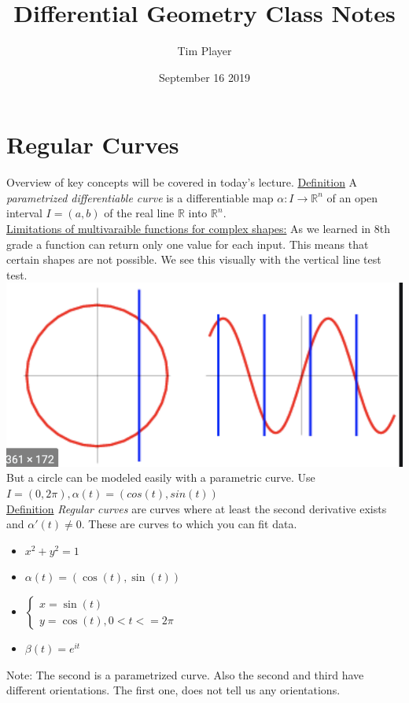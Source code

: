 \documentclass{article}
\title{Differential Geometry Class Notes}
\author{Tim Player }
\date{September 16 2019}
\begin{document}
\maketitle

\section{Regular Curves}
Overview of key concepts will be covered in today's lecture.
\underline{Definition}
A \emph{parametrized differentiable curve} is a differentiable map $\alpha : I \to \mathbb{R}^n$ of an open
interval $I = (a,b)$ of the real line $\mathbb{R}$ into $\mathbb{R}^n$. \\
\underline{Limitations of multivaraible functions for complex shapes:}
As we learned in 8th grade a function can return only one value for each input. This means that certain shapes are not possible. We see this visually with the vertical line test test. \\
\includegraphics[scale=.5]{vline.png} \\
But a circle can be modeled easily with a parametric curve. Use $I = (0, 2\pi), \alpha(t) = (cos(t), sin(t))$\\
\underline{Definition} \textit{Regular curves} are curves where at least the second derivative exists and $\alpha'(t) \ne 0$. These are curves to which you can fit data.
 \\

\begin{itemize}
    \item $x^2 + y^2 = 1$
    \item $\alpha(t) = (\cos(t), \sin(t))$
    \item $\begin{cases}
        x = \sin(t) \\
        y = \cos(t) , 0 < t <= 2\pi 
        \end{cases}$
    \item $\beta(t) = e^{i t}$
\end{itemize}
Note: The second is a parametrized curve. Also the second and third have different orientations. 
The first one, does not tell us any orientations. 
\end{document}

